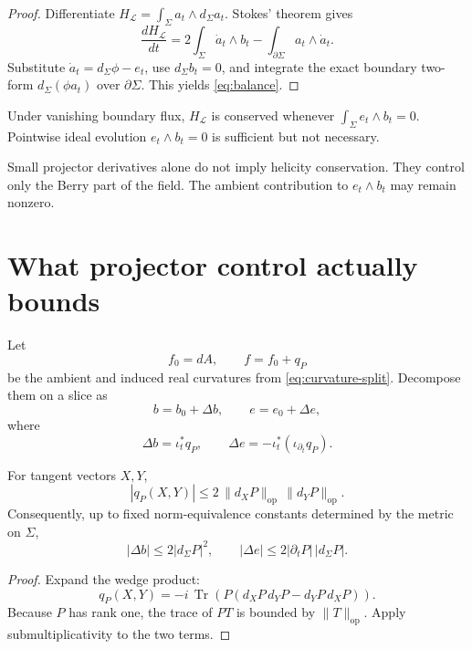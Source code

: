 \documentclass[11pt]{article}
\DeclareMathOperator{\Tr}{Tr}
\newcommand{\cL}{\mathcal L}
\begin{document}
\begin{proof}
Differentiate \(H_\cL=\int_\Sigma a_t\wedge d_\Sigma a_t\).  Stokes'
theorem gives
\[
\frac{dH_\cL}{dt}
=2\int_\Sigma \dot a_t\wedge b_t
-\int_{\partial\Sigma}a_t\wedge\dot a_t.
\]
Substitute \(\dot a_t=d_\Sigma\phi-e_t\), use
\(d_\Sigma b_t=0\), and integrate the exact boundary two-form
\(d_\Sigma(\phi a_t)\) over \(\partial\Sigma\).  This yields
\cref{eq:balance}.
\end{proof}

\par\medskip
\begin{corollary}\label{cor:conservation}
Under vanishing boundary flux, \(H_\cL\) is conserved whenever
\(\int_\Sigma e_t\wedge b_t=0\).  Pointwise ideal evolution
\(e_t\wedge b_t=0\) is sufficient but not necessary.
\end{corollary}

Small projector derivatives alone do not imply helicity conservation.
They control only the Berry part of the field.  The ambient contribution to
\(e_t\wedge b_t\) may remain nonzero.

\section{What projector control actually bounds}
\label{sec:comparison}

Let
\[
f_0=dA,\qquad f=f_0+q_P
\]
be the ambient and induced real curvatures from
\cref{eq:curvature-split}.  Decompose them on a slice as
\[
b=b_0+\Delta b,\qquad e=e_0+\Delta e,
\]
where
\[
\Delta b=\iota_t^*q_P,
\qquad
\Delta e=-\iota_t^*(\iota_{\partial_t}q_P).
\]

\begin{proposition}
\label{prop:berry-bounds}
For tangent vectors \(X,Y\),
\[
|q_P(X,Y)|
\le 2\,\|d_XP\|_{\mathrm{op}}\,\|d_YP\|_{\mathrm{op}}.
\]
Consequently, up to fixed norm-equivalence constants determined by the metric
on \(\Sigma\),
\[
|\Delta b|\le 2|d_\Sigma P|^2,
\qquad
|\Delta e|\le 2|\partial_tP|\,|d_\Sigma P|.
\]
\end{proposition}

\begin{proof}
Expand the wedge product:
\[
q_P(X,Y)
=-i\,\Tr\!\left(P(d_XP\,d_YP-d_YP\,d_XP)\right).
\]
Because \(P\) has rank one, the trace of \(PT\) is bounded by
\(\|T\|_{\mathrm{op}}\).  Apply submultiplicativity to the two terms.
\end{proof}
\end{document}
